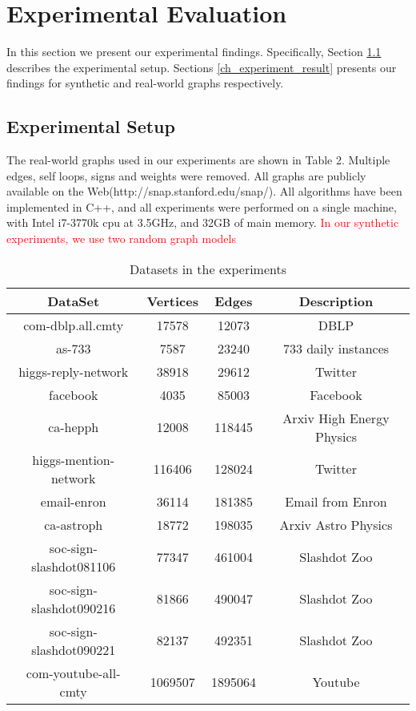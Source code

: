 \documentclass{sig-alternate-2013}
\begin{document}
\section{Experimental Evaluation}
In this section we present our experimental findings. Specifically, Section \ref{ch_experiment_setup} describes the experimental setup.
Sections \ref{ch_experiment_result} presents our findings for synthetic and real-world graphs respectively.
\subsection{Experimental Setup}\label{ch_experiment_setup}

The real-world graphs used in our experiments are shown in Table 2.
Multiple edges, self loops, signs and weights were removed.
All graphs are publicly available on the Web(http://snap.stanford.edu/snap/).
All algorithms have been implemented in C++, and all experiments were performed on a single machine,
with Intel i7-3770k cpu at 3.5GHz, and 32GB of main memory.
\textcolor{red}{In our synthetic experiments, we use two random graph models}

\begin{table*}[!hpp]
\centering
\caption{Datasets in the experiments}
\begin{tabular}{cccc}
\hline
DataSet & Vertices & Edges & Description\\
\hline
com-dblp.all.cmty       & 17578     & 12073   & DBLP\\
as-733                  & 7587      & 23240   & 733 daily instances\\
higgs-reply-network     & 38918     & 29612   & Twitter\\
facebook                & 4035      & 85003   & Facebook \\
ca-hepph                & 12008     & 118445  & Arxiv High Energy Physics\\
higgs-mention-network   & 116406    & 128024  & Twitter\\
email-enron             & 36114     & 181385  & Email from Enron\\
ca-astroph              & 18772     & 198035  & Arxiv Astro Physics\\
soc-sign-slashdot081106 & 77347     & 461004  & Slashdot Zoo \\
soc-sign-slashdot090216 & 81866     & 490047  & Slashdot Zoo\\
soc-sign-slashdot090221 & 82137     & 492351  & Slashdot Zoo\\
com-youtube-all-cmty    & 1069507   & 1895064 & Youtube\\
\hline
\end{tabular}
\end{table*}
\end{document}
